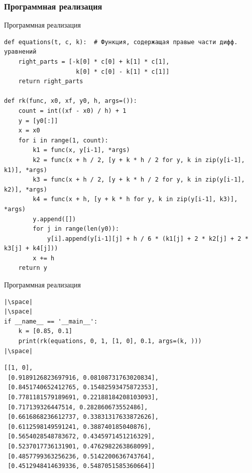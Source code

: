 \documentclass[aspectratio=169, mathserif]{beamer}	%
\begin{document}
\subsubsection{Программная реализация}
\begin{frame}[fragile, ]{Программная реализация}
\scriptsize
\begin{verbatim}
def equations(t, c, k):  # Функция, содержащая правые части дифф. уравнений
    right_parts = [-k[0] * c[0] + k[1] * c[1],
                    k[0] * c[0] - k[1] * c[1]]
    return right_parts

def rk(func, x0, xf, y0, h, args=()):
    count = int((xf - x0) / h) + 1
    y = [y0[:]]
    x = x0
    for i in range(1, count):
        k1 = func(x, y[i-1], *args)
        k2 = func(x + h / 2, [y + k * h / 2 for y, k in zip(y[i-1], k1)], *args)
        k3 = func(x + h / 2, [y + k * h / 2 for y, k in zip(y[i-1], k2)], *args)
        k4 = func(x + h, [y + k * h for y, k in zip(y[i-1], k3)], *args)
        y.append([])
        for j in range(len(y0)):
            y[i].append(y[i-1][j] + h / 6 * (k1[j] + 2 * k2[j] + 2 * k3[j] + k4[j]))
        x += h
    return y
\end{verbatim}
\vfill
\end{frame}


\begin{frame}[fragile, ]{Программная реализация}
\scriptsize
\begin{verbatim}
|\space|
|\space|
if __name__ == '__main__':
    k = [0.85, 0.1]
    print(rk(equations, 0, 1, [1, 0], 0.1, args=(k, )))
|\space|
\end{verbatim}
\vfill
\begin{verbatim}
[[1, 0],
 [0.9189126823697916, 0.08108731763020834],
 [0.8451740652412765, 0.15482593475872353],
 [0.7781181579189691, 0.22188184208103093],
 [0.717139326447514, 0.282860673552486],
 [0.6616868236612737, 0.33831317633872626],
 [0.6112598149591241, 0.388740185040876],
 [0.5654028548783672, 0.4345971451216329],
 [0.5237017736131901, 0.4762982263868099],
 [0.4857799363256236, 0.5142200636743764],
 [0.4512948414639336, 0.5487051585360664]]
\end{verbatim}
\vfill
\end{frame}
\end{document}
